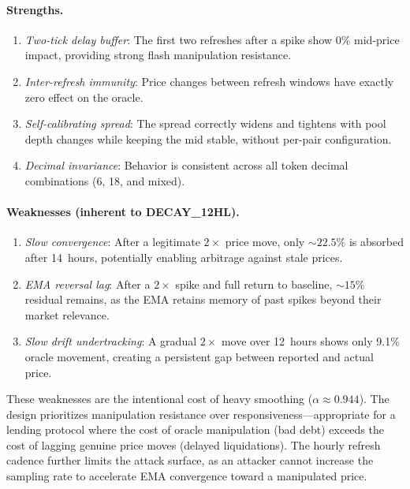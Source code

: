 \documentclass[10pt,a4paper,twocolumn]{article}
\theoremstyle{definition}
\theoremstyle{plain}
\theoremstyle{remark}
\begin{document}
\paragraph{Strengths.}
\begin{enumerate}[leftmargin=*]
\item \emph{Two-tick delay buffer}: The first two refreshes after a spike show 0\% mid-price impact, providing strong flash manipulation resistance.
\item \emph{Inter-refresh immunity}: Price changes between refresh windows have exactly zero effect on the oracle.
\item \emph{Self-calibrating spread}: The spread correctly widens and tightens with pool depth changes while keeping the mid stable, without per-pair configuration.
\item \emph{Decimal invariance}: Behavior is consistent across all token decimal combinations (6, 18, and mixed).
\end{enumerate}

\paragraph{Weaknesses (inherent to DECAY\_12HL).}
\begin{enumerate}[leftmargin=*]
\item \emph{Slow convergence}: After a legitimate $2\times$ price move, only ${\sim}22.5\%$ is absorbed after 14~hours, potentially enabling arbitrage against stale prices.
\item \emph{EMA reversal lag}: After a $2\times$ spike and full return to baseline, ${\sim}15\%$ residual remains, as the EMA retains memory of past spikes beyond their market relevance.
\item \emph{Slow drift undertracking}: A gradual $2\times$ move over 12~hours shows only 9.1\% oracle movement, creating a persistent gap between reported and actual price.
\end{enumerate}

These weaknesses are the intentional cost of heavy smoothing ($\alpha \approx 0.944$). The design prioritizes manipulation resistance over responsiveness---appropriate for a lending protocol where the cost of oracle manipulation (bad debt) exceeds the cost of lagging genuine price moves (delayed liquidations). The hourly refresh cadence further limits the attack surface, as an attacker cannot increase the sampling rate to accelerate EMA convergence toward a manipulated price.
\end{document}
